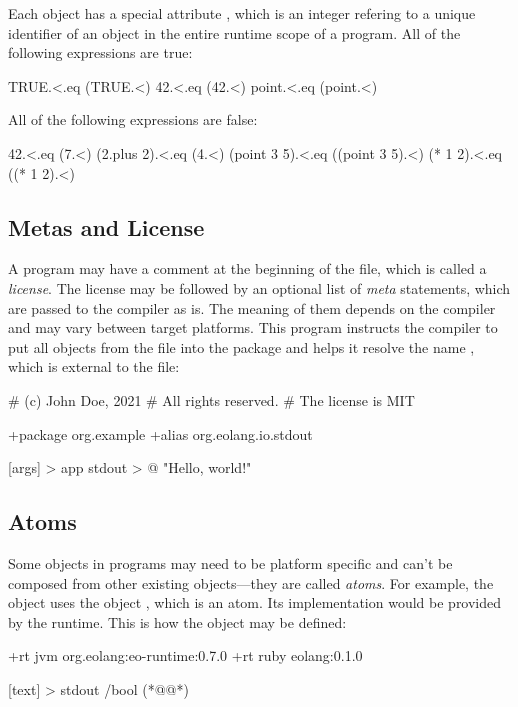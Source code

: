 Each object has a special attribute \ff{<}, which is an integer
refering to a unique identifier of an object in the entire
runtime scope of a program. All of the following expressions are true:

\begin{ffcode}
TRUE.<.eq (TRUE.<)
42.<.eq (42.<)
point.<.eq (point.<)
\end{ffcode}

All of the following expressions are false:

\begin{ffcode}
42.<.eq (7.<)
(2.plus 2).<.eq (4.<)
(point 3 5).<.eq ((point 3 5).<)
(* 1 2).<.eq ((* 1 2).<)
\end{ffcode}

\subsection{Metas and License}

A program may have a comment at the beginning of the file, which
is called a \emph{license}. The license may be followed by an optional
list of \emph{meta} statements, which are passed to the compiler
as is. The meaning of them depends on the compiler and may vary
between target platforms. This program instructs the compiler
to put all objects from the file into the package 
and helps it resolve the name , which is external
to the file:

\begin{ffcode}
# (c) John Doe, 2021
# All rights reserved.
# The license is MIT

+package org.example
+alias org.eolang.io.stdout

[args] > app
  stdout > @
    "Hello, world!\n"
\end{ffcode}

\subsection{Atoms}

Some objects in \eolang{} programs may need to be platform specific
and can't be composed from other existing objects---they are called
\emph{atoms}.
For example, the object  uses the object ,
which is an atom. Its implementation would be provided by the
runtime. This is how the object may be defined:

\begin{ffcode}
+rt jvm org.eolang:eo-runtime:0.7.0
+rt ruby eolang:0.1.0

[text] > stdout /bool (*@\label{ln:stdout}@*)
\end{ffcode}

